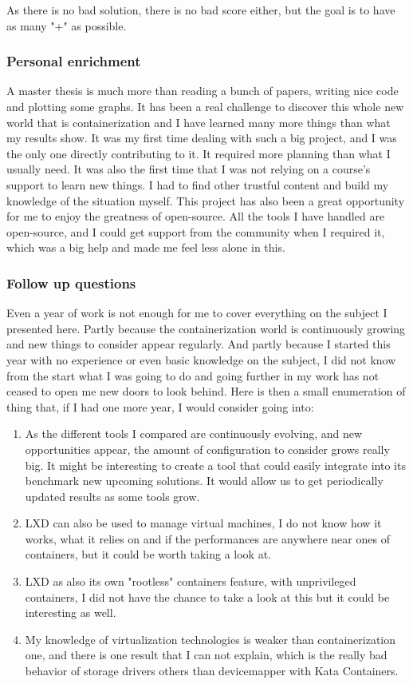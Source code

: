 As there is no bad solution, there is no bad score either, but the goal is to have as many "+" as possible.

\subsubsection{Personal enrichment}
A master thesis is much more than reading a bunch of papers, writing nice code and plotting some graphs.  It has been a real challenge to discover this whole new world that is containerization and I have learned many more things than what my results show.  It was my first time dealing with such a big project, and I was the only one directly contributing to it.  It required more planning than what I usually need.  It was also the first time that I was not relying on a course's support to learn new things. I had to find other trustful content and build my knowledge of the situation myself.  This project has also been a great opportunity for me to enjoy the greatness of open-source. All the tools I have handled are open-source, and I could get support from the community when I required it, which was a big help and made me feel less alone in this.

\subsubsection{Follow up questions}

Even a year of work is not enough for me to cover everything on the subject I presented here.  Partly because the containerization world is continuously growing and new things to consider appear regularly.  And partly because I started this year with no experience or even basic knowledge on the subject, I did not know from the start what I was going to do and going further in my work has not ceased to open me new doors to look behind.  Here is then a small enumeration of thing that, if I had one more year, I would consider going into:
\begin{enumerate}
  \item As the different tools I compared are continuously evolving, and new opportunities appear, the amount of configuration to consider grows really big.  It might be interesting to create a tool that could easily integrate into its benchmark new upcoming solutions.  It would allow us to get periodically updated results as some tools grow.
  \item LXD can also be used to manage virtual machines, I do not know how it works, what it relies on and if the performances are anywhere near ones of containers, but it could be worth taking a look at.
  \item LXD as also its own "rootless" containers feature, with unprivileged containers, I did not have the chance to take a look at this but it could be interesting as well.
  \item My knowledge of virtualization technologies is weaker than containerization one, and there is one result that I can not explain, which is the really bad behavior of storage drivers others than devicemapper with Kata Containers.
\end{enumerate}
